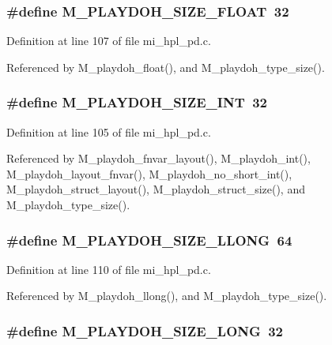 \subsubsection{\setlength{\rightskip}{0pt plus 5cm}\#define M\_\-PLAYDOH\_\-SIZE\_\-FLOAT~32}\label{mi__hpl__pd_8c_8362b170ae7f5fe8fd55de4bbb01c968}




Definition at line 107 of file mi\_\-hpl\_\-pd.c.

Referenced by M\_\-playdoh\_\-float(), and M\_\-playdoh\_\-type\_\-size().
\subsubsection{\setlength{\rightskip}{0pt plus 5cm}\#define M\_\-PLAYDOH\_\-SIZE\_\-INT~32}\label{mi__hpl__pd_8c_51da0bba37a2655343e60a7d19e7212f}




Definition at line 105 of file mi\_\-hpl\_\-pd.c.

Referenced by M\_\-playdoh\_\-fnvar\_\-layout(), M\_\-playdoh\_\-int(), M\_\-playdoh\_\-layout\_\-fnvar(), M\_\-playdoh\_\-no\_\-short\_\-int(), M\_\-playdoh\_\-struct\_\-layout(), M\_\-playdoh\_\-struct\_\-size(), and M\_\-playdoh\_\-type\_\-size().
\subsubsection{\setlength{\rightskip}{0pt plus 5cm}\#define M\_\-PLAYDOH\_\-SIZE\_\-LLONG~64}\label{mi__hpl__pd_8c_a8254c69d0479f151147a1b91cab9707}




Definition at line 110 of file mi\_\-hpl\_\-pd.c.

Referenced by M\_\-playdoh\_\-llong(), and M\_\-playdoh\_\-type\_\-size().
\subsubsection{\setlength{\rightskip}{0pt plus 5cm}\#define M\_\-PLAYDOH\_\-SIZE\_\-LONG~32}\label{mi__hpl__pd_8c_db65c7fbc04b0ece7f2f5dc50abda224}




